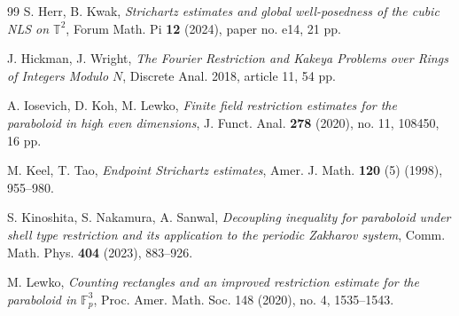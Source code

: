 \documentclass[11pt,reqno]{amsart}
\numberwithin{equation}{section}
\begin{document}
\begin{thebibliography}{99}
 S. Herr, B. Kwak, \textit{Strichartz estimates and global well-posedness of the cubic NLS on $\mathbb{T}^{2}$}, Forum Math. Pi \textbf{12} (2024), paper no. e14, 21 pp.

 J. Hickman, J. Wright, \textit{The Fourier Restriction and Kakeya Problems over Rings of Integers Modulo $N$}, Discrete Anal. 2018, article 11, 54 pp.

 A. Iosevich, D. Koh, M. Lewko, \textit{Finite field restriction estimates for the paraboloid in high even dimensions}, J. Funct. Anal. \textbf{278} (2020), no. 11, 108450, 16 pp.


 M. Keel, T. Tao, \textit{Endpoint Strichartz estimates}, Amer. J. Math. \textbf{120} (5) (1998), 955--980.



 S. Kinoshita, S. Nakamura, A. Sanwal, \textit{Decoupling inequality for paraboloid under shell type restriction and its application to the periodic Zakharov system}, Comm. Math. Phys. \textbf{404} (2023), 883--926. 




 M. Lewko, \textit{Counting rectangles and an improved restriction estimate for the paraboloid in $\mathbb{F}^3_p$}, Proc. Amer. Math. Soc. 148 (2020), no. 4, 1535--1543.



\end{thebibliography}
\end{document}
